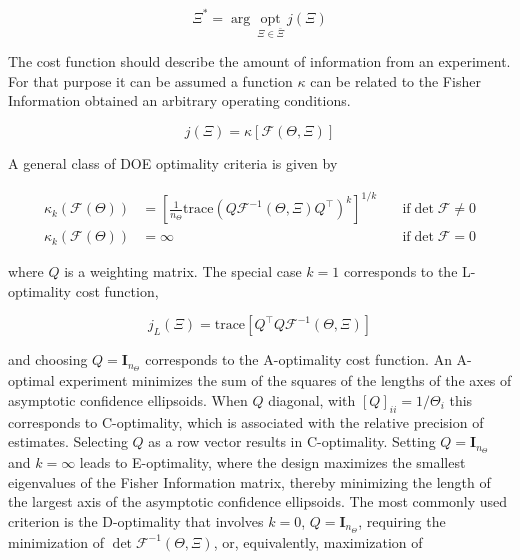 \documentclass[../Article_Design_of_Experiment.tex]{subfiles}
\begin{document}
	{\footnotesize
	\begin{equation}
		\Xi^* = \arg~\underset{\Xi \in \bar{\Xi}}{\text{opt}}~j\left(\Xi\right)
	\end{equation} }
	
	The cost function should describe the amount of information from an experiment. For that purpose it can be assumed a function $\kappa$ can be related to the Fisher Information obtained an arbitrary operating conditions.
	
	{\footnotesize
	\begin{equation}
		j(\Xi) = \kappa\left[ \mathcal{F}(\Theta, \Xi) \right]
	\end{equation} }
	
	
	A general class of DOE optimality criteria is given by
	
	{\footnotesize
	\begin{align}
		\kappa_k(\mathcal{F}(\Theta)) &= \left[\frac{1}{n_\Theta} \text{trace}\left( Q\mathcal{F}^{-1}(\Theta, \Xi) Q^\top \right)^k \right]^{1/k} \quad &\text{if} \det \mathcal{F} \neq 0 \nonumber \\
		\kappa_k(\mathcal{F}(\Theta)) &= \infty \quad &\text{if} \det \mathcal{F} = 0
	\end{align} }
	
	where $Q$ is a weighting matrix. The special case $k = 1$ corresponds to the L-optimality cost function,
	
	{\footnotesize
	\begin{equation}
		j_L(\Xi) = \text{trace} \left[ Q^\top Q\mathcal{F}^{-1}(\Theta,\Xi) \right]
	\end{equation} }
	
	and choosing $Q = \textbf{I}_{n_\Theta}$ corresponds to the A-optimality cost function. An A-optimal experiment minimizes the sum of the squares of the lengths of the axes of asymptotic confidence ellipsoids. When $Q$ diagonal, with $[Q]_{ii} = 1/\Theta_i$ this corresponds to C-optimality, which is associated with the relative precision of estimates. Selecting $Q$ as a row vector results in C-optimality. Setting $Q = \textbf{I}_{n_\Theta}$ and $k = \infty$ leads to E-optimality, where the design maximizes the smallest eigenvalues of the Fisher Information matrix, thereby minimizing the length of the largest axis of the asymptotic confidence ellipsoids. The most commonly used criterion is the D-optimality that involves $k = 0$, $Q = \textbf{I}_{n_\Theta}$, requiring the minimization of $\det \mathcal{F}^{-1}(\Theta, \Xi)$, or, equivalently, maximization of
	
\end{document}
